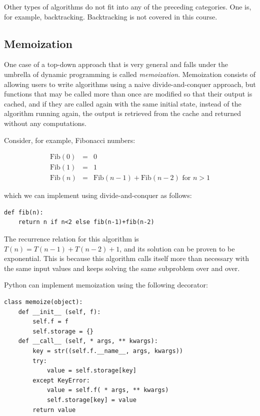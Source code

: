 \documentclass[justified, sixbynine]{tufte-book}
\def\ft{\small\tt}
\theoremstyle{plain}%
\newtheorem * {corollary}{Corollary}
\theoremstyle{definition}
\theoremstyle{remark}
\newtheorem * {remark}{Remark}
\newtheorem * {note}{Note}
\begin{document}
\begin{fullwidth}
Other types of algorithms do not fit into any of the preceding
categories. One is, for example, backtracking. Backtracking is not covered
in this course.

\goodbreak\subsection{Memoization}


One case of a top-down approach that is very general and falls under the umbrella of dynamic programming is called {\it memoization}. Memoization consists of allowing users to write algorithms using a naive divide-and-conquer approach, but functions that may be called more than once are modified so that their output is cached, and if they are called again with the same initial state, instead of the algorithm running again, the output is retrieved from the cache and returned without any computations.


Consider, for example, Fibonacci numbers:

\begin{eqnarray}
\textrm{Fib}(0)&=&0\\
\textrm{Fib}(1)&=&1\\
\textrm{Fib}(n)&=&\textrm{Fib}(n-1)+\textrm{Fib}(n-2)\textrm{ for }n>1
\end{eqnarray}

which we can implement using divide-and-conquer as follows:

\begin{lstlisting}
def fib(n):
    return n if n<2 else fib(n-1)+fib(n-2)
\end{lstlisting}

The recurrence relation for this algorithm is $T(n)=T(n-1)+T(n-2)+1$, and its solution can be proven to be exponential. This is because this algorithm calls itself more than necessary with the same input values and keeps solving the same subproblem over and over.


Python can implement memoization using the following decorator:
\begin{lstlisting}[caption={in file: {\ft nlib.py}}]
class memoize(object):
    def __init__ (self, f):
        self.f = f
        self.storage = {}
    def __call__ (self, * args, ** kwargs):
        key = str((self.f.__name__, args, kwargs))
        try:
            value = self.storage[key]
        except KeyError:
            value = self.f( * args, ** kwargs)
            self.storage[key] = value
        return value
\end{lstlisting}


\end{fullwidth}
\end{document}
